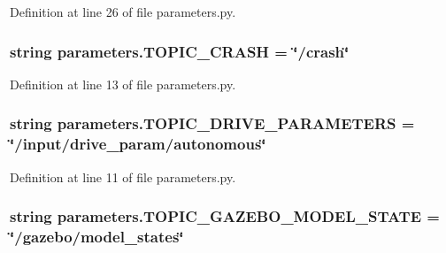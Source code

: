 Definition at line 26 of file parameters.\+py.

\subsubsection[{\texorpdfstring{T\+O\+P\+I\+C\+\_\+\+C\+R\+A\+SH}{TOPIC_CRASH}}]{\setlength{\rightskip}{0pt plus 5cm}string parameters.\+T\+O\+P\+I\+C\+\_\+\+C\+R\+A\+SH = \char`\"{}/crash\char`\"{}}\hypertarget{namespaceparameters_a5e392ed4d998f10824bfd96a0eae2988}{}\label{namespaceparameters_a5e392ed4d998f10824bfd96a0eae2988}


Definition at line 13 of file parameters.\+py.

\subsubsection[{\texorpdfstring{T\+O\+P\+I\+C\+\_\+\+D\+R\+I\+V\+E\+\_\+\+P\+A\+R\+A\+M\+E\+T\+E\+RS}{TOPIC_DRIVE_PARAMETERS}}]{\setlength{\rightskip}{0pt plus 5cm}string parameters.\+T\+O\+P\+I\+C\+\_\+\+D\+R\+I\+V\+E\+\_\+\+P\+A\+R\+A\+M\+E\+T\+E\+RS = \char`\"{}/input/drive\+\_\+param/autonomous\char`\"{}}\hypertarget{namespaceparameters_a855cb11de60782b8e9997af80bdab518}{}\label{namespaceparameters_a855cb11de60782b8e9997af80bdab518}


Definition at line 11 of file parameters.\+py.

\subsubsection[{\texorpdfstring{T\+O\+P\+I\+C\+\_\+\+G\+A\+Z\+E\+B\+O\+\_\+\+M\+O\+D\+E\+L\+\_\+\+S\+T\+A\+TE}{TOPIC_GAZEBO_MODEL_STATE}}]{\setlength{\rightskip}{0pt plus 5cm}string parameters.\+T\+O\+P\+I\+C\+\_\+\+G\+A\+Z\+E\+B\+O\+\_\+\+M\+O\+D\+E\+L\+\_\+\+S\+T\+A\+TE = \char`\"{}/gazebo/model\+\_\+states\char`\"{}}\hypertarget{namespaceparameters_a9d4157266ec0afde91ab7d58be4f688d}{}\label{namespaceparameters_a9d4157266ec0afde91ab7d58be4f688d}


